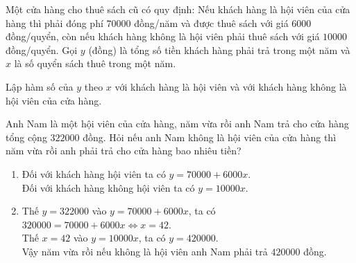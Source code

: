 \begin{ex}%
	Một cửa hàng cho thuê sách cũ có quy định: Nếu khách hàng là hội viên của cửa hàng thì phải đóng phí $70000$ đồng/năm và được thuê sách với giá $6000$ đồng/quyển, còn nếu khách hàng không là hội viên phải thuê sách với giá $10000$ đồng/quyển. Gọi $y$ (đồng) là tổng số tiền khách hàng phải trả trong một năm và $x$ là số quyển sách thuê trong một năm.
	\begin{listEX}
		\item Lập hàm số của $y$ theo $x$ với khách hàng là hội viên và với khách hàng không là hội viên của cửa hàng.
		\item Anh Nam là một hội viên của cửa hàng, năm vừa rồi anh Nam trả cho cửa hàng tổng cộng
		$322000$ đồng. Hỏi nếu anh Nam không là hội viên của cửa hàng thì năm vừa rồi anh phải trả
		cho cửa hàng bao nhiêu tiền?
	\end{listEX}
	\loigiai
	{
		\begin{enumerate}
			\item Đối với khách hàng hội viên ta có $y=70000+6000x$.\\
			      Đối với khách hàng không hội viên ta có $y=10000x$.
			\item Thế $y=322000$ vào $y=70000+6000x$, ta có $320000=70000+6000x \Leftrightarrow x=42$.\\
			      Thế $x=42$ vào $y=10000x$, ta có $y=420000$.\\
			      Vậy năm vừa rồi nếu không là hội viên anh Nam phải trả $420000$ đồng.
		\end{enumerate}
	}
\end{ex}



%
